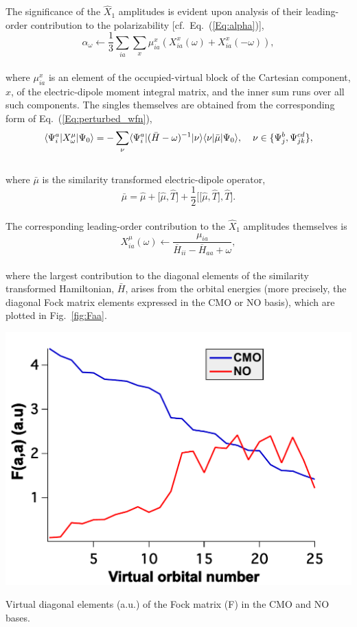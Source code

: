 The significance of the $\hat{X}_1$ amplitudes is evident upon analysis of
their leading-order contribution to the polarizability [cf.\
Eq.~(\ref{Eq:alpha})],
\\
\begin{equation}
\alpha_\omega \leftarrow \frac{1}{3} \sum\limits_{ia}\sum\limits_x \mu^{x}_{ia}(X^x_{ia}(\omega) +
X^x_{ia}(-\omega)),
\label{Eq:leading_X1}
\end{equation} 
\\
where $\mu^x_{ia}$ is an element of the occupied-virtual block of the
Cartesian component, $x$, of the electric-dipole moment integral matrix, and the inner
sum runs over all such components. The singles
themselves are obtained from the corresponding form of
Eq.~(\ref{Eq:perturbed_wfn}),
\\
\begin{equation} 
\langle\Psi^a_i|X^{\mu}_{\omega}|\Psi_0\rangle =
-\sum_{\nu}\langle\Psi^a_i|(\bar{H} -
\omega)^{-1}|\nu\rangle\langle\nu|\bar{\mu}|\Psi_0\rangle,
\hspace{0.15in}\nu
\in \{\Psi^b_j,\Psi^{cd}_{jk}\},
\label{Eq:singles}
\end{equation} 
\\
where $\bar{\mu}$ is the similarity transformed electric-dipole operator,
\\
\begin{equation}
\bar{\mu} = \hat{\mu} + \bigg[\hat{\mu},\hat{T}\bigg] +
\frac{1}{2}\bigg[\bigg[\hat{\mu},\hat{T}\bigg],\hat{T}\bigg].
\label{Eq:mubar}
\end{equation}
\\
The corresponding leading-order contribution to the $\hat{X}_1$ amplitudes themselves is
\\
\begin{equation}
X^{\mu}_{ia}(\omega) \leftarrow \frac{\mu_{ia}}{\overbar{H}_{ii} -
\overbar{H}_{aa} + \omega},
\label{Eq:X1}
\end{equation}
\\
where the largest contribution to the diagonal elements of the similarity
transformed Hamiltonian, $\bar{H}$, arises from the orbital energies (more
precisely, the diagonal Fock matrix elements expressed in the CMO or NO
basis), which are plotted in Fig.~\ref{fig:Faa}. 
\begin{MyFigure}[h!]
\centering
\includegraphics[width=0.6\linewidth,natwidth=610,natheight=642]{figures_fvno/Faa.pdf}
\caption{{\footnotesize Virtual diagonal elements (a.u.) of the Fock matrix (F) in
the CMO and NO bases.}}
\label{fig:Faa}
\end{MyFigure}
